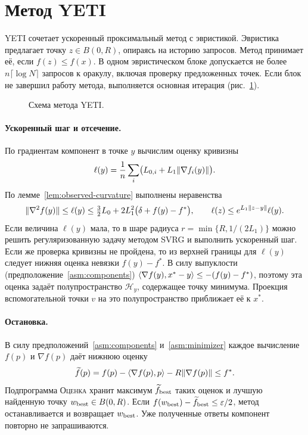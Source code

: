 \section{Метод YETI}\label{sec:cheap}
YETI сочетает ускоренный проксимальный метод с эвристикой.
Эвристика предлагает точку $z\in B(0,R)$, опираясь на историю запросов.
Метод принимает её, если $f(z)\le f(x)$. В одном эвристическом блоке
допускается не более $n\lceil\log N\rceil$ запросов к оракулу, включая
проверку предложенных точек. Если блок не завершил работу метода,
выполняется основная итерация (рис.~\ref{fig:cheap-flow}).

\begin{figure}[H]
\centering
\caption{Схема метода YETI.}\label{fig:cheap-flow}
\end{figure}

\paragraph{Ускоренный шаг и отсечение.}
По градиентам компонент в точке $y$ вычислим оценку кривизны
\[
 \ell(y)=\frac1n\sum_i\bigl(L_{0,i}+L_1\lVert\nabla f_i(y)\rVert\bigr).
\]
По лемме~\ref{lem:observed-curvature} выполнены неравенства
\[
 \lVert\nabla^2f(y)\rVert\le\ell(y)
 \le\tfrac32L_0+2L_1^2\bigl(\delta+f(y)-f^\ast\bigr),
 \qquad \ell(z)\le e^{L_1\lVert z-y\rVert}\ell(y).
\]
Если величина $\ell(y)$ мала, то в шаре радиуса $r=\min\{R,1/(2L_1)\}$
можно решить регуляризованную задачу методом SVRG и выполнить
ускоренный шаг. Если же проверка кривизны не пройдена,
то из верхней границы для $\ell(y)$ следует нижняя оценка невязки $f(y)-f^\ast$.
В силу выпуклости (предположение~\ref{asm:components}) $\langle \nabla f(y),x^\ast-y\rangle\le-(f(y)-f^\ast)$,
поэтому эта оценка задаёт полупространство $\mathcal H_y$,
содержащее точку минимума. Проекция вспомогательной точки $v$
на это полупространство приближает её к $x^\ast$.

\paragraph{Остановка.}
В силу предположений~\ref{asm:components} и~\ref{asm:minimizer}
каждое вычисление $f(p)$ и $\nabla f(p)$ даёт нижнюю оценку
\[
 \widetilde f(p)=f(p)-\langle \nabla f(p),p\rangle-R\lVert\nabla f(p)\rVert\le f^\ast.
\]
Подпрограмма \textsc{Оценка} хранит максимум $\widetilde f_{\rm best}$
таких оценок и лучшую найденную точку $w_{\rm best}\in B(0,R)$.
Если $f(w_{\rm best})-\widetilde f_{\rm best}\le\varepsilon/2$,
метод останавливается и возвращает $w_{\rm best}$. Уже полученные ответы
компонент повторно не запрашиваются.


